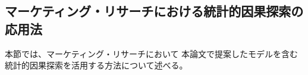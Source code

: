 
\subsection{マーケティング・リサーチにおける統計的因果探索の応用法}

本節では、マーケティング・リサーチにおいて
本論文で提案したモデルを含む統計的因果探索を活用する方法について述べる。
